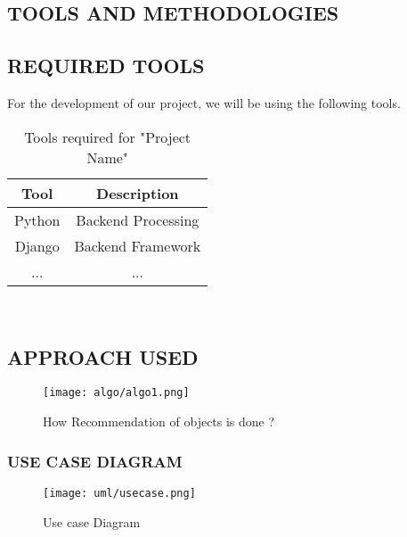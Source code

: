 \begin{center}
	\chapter{TOOLS AND METHODOLOGIES}
\end{center}
	
\section{REQUIRED TOOLS}

	\par
	For the development of our project, we will be using the following tools.
	\linebreak
	

\begin{table}[h!]
  \begin{center}
    \label{tab:table1}	

	\begin{tabular}{|c|c|}
        \hline
        Tool & Description \\
        \hline
        Python &  Backend Processing \\
        Django &  Backend Framework\\
        ... &  ...\\
        \hline
    \end{tabular}
    \\[3em] %
    \caption{Tools required for "Project Name"}
  \end{center}
\end{table}

\section{APPROACH USED}
\lipsum[4]
\begin{figure}[h!]
	\begin{center}
		\texttt{[image: algo/algo1.png]}
	\end{center}
	\caption{How Recommendation of objects is done ?}
\end{figure}
\linebreak
\lipsum[4]


\subsection{USE CASE DIAGRAM}
\lipsum[4]
\begin{figure}[h!]
	\begin{center}
		\texttt{[image: uml/usecase.png]}
	\end{center}
	\caption{Use case Diagram}
\end{figure}

